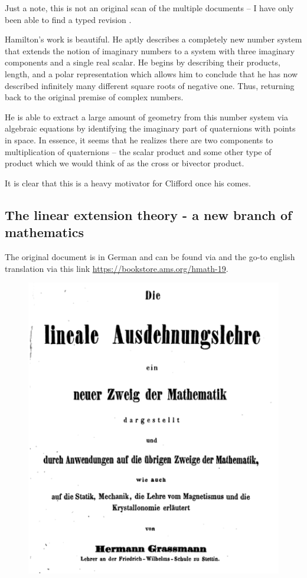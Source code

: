 \documentclass[12pt]{article}
\begin{document}
Just a note, this is not an original scan of the multiple documents -- I have only been able to find a typed revision \cite{hamilton_quaternions_nodate}. 

Hamilton's work is beautiful. He aptly describes a completely new number system that extends the notion of imaginary numbers to a system with three imaginary components and a single real scalar. He begins by describing their products, length, and a polar representation which allows him to conclude that he has now described infinitely many different square roots of negative one. Thus, returning back to the original premise of complex numbers.

He is able to extract a large amount of geometry from this number system via algebraic equations by identifying the imaginary part of quaternions with points in space. In essence, it seems that he realizes there are two components to multiplication of quaternions -- the scalar product and some other type of product which we would think of as the cross or bivector product. 

It is clear that this is a heavy motivator for Clifford once his comes.

\newpage
\subsection{The linear extension theory - a new branch of mathematics}

The original document is in German and can be found via \cite{grassmann_lineale_1844} and the go-to english translation via this link \url{https://bookstore.ams.org/hmath-19}. 
\begin{figure}[H]
    \centering
    \includegraphics[width=.6\textwidth]{figures/grassmann_title.png}
\end{figure}
\end{document}
